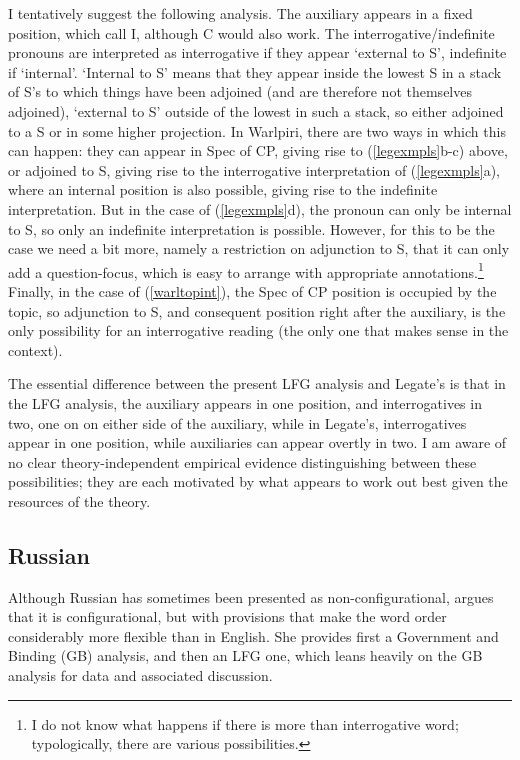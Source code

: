 \documentclass[output=paper,hidelinks]{langscibook}
\begin{document}
\z
I tentatively suggest the following analysis.  The auxiliary appears in a
fixed position, which \citeauthor{AustBres96} call I, although C would also work.
The interrogative/indefinite pronouns
are interpreted as interrogative if they appear `external to S', indefinite
if `internal'.  `Internal to S' means that they appear inside the lowest S
in a stack of S's to which things have been adjoined (and are therefore not
themselves adjoined), `external to S' outside of the lowest in such a stack, so
either adjoined to a S or in some higher projection.  In Warlpiri, there are two ways in which this
can happen: they can appear in Spec of CP, giving rise to (\ref{legexmpls}b-c)
above, or adjoined to S, giving rise to the interrogative interpretation of
(\ref{legexmpls}a), where an internal position is also possible, giving rise
to the indefinite interpretation.  But in the case of (\ref{legexmpls}d), the
pronoun can only be internal to S, so only an indefinite interpretation
is  possible. However, for this to be the case we need a bit more, namely a restriction on adjunction to S, that it can only add
a question-focus, which is easy to arrange with appropriate annotations.\footnote
  {I do not know what happens if there is more than interrogative word; typologically,
  there are various possibilities.}
Finally, in the case of
(\ref{warltopint}), the Spec of CP position is occupied by the topic, so adjunction
to S, and consequent position right after the auxiliary, is the only possibility
for an interrogative reading (the only one that makes sense in the context).

The essential difference between the present LFG analysis and Legate's is that in
the LFG analysis, the auxiliary appears in one position, and interrogatives in two, one
on on either side of the auxiliary, while in Legate's, interrogatives appear in one
position, while auxiliaries can appear overtly in two.
I am aware of no clear theory-independent empirical evidence distinguishing
between these possibilities; they are each motivated by what appears to work out
best given the resources of the theory.

\subsection{Russian}\label{russian}
Although Russian has sometimes been presented as non-configurational, \citet{King95}
argues that it is configurational, but with provisions that make the word order
considerably more flexible than in English. She provides first a Government and Binding (GB)
analysis, and then an LFG one, which leans heavily on the GB analysis for data
and associated discussion.
\end{document}
